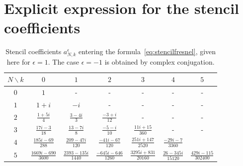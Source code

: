 \documentclass[aps,showpacs,twocolumn,
prd,superscriptaddress,nofootinbib]{revtex4-1}
\begin{document}
\section{Explicit expression for the stencil coefficients}
\label{app:stencil}

\begin{table}[t]
\begin{ruledtabular}\caption{Stencil coefficients $a_{N,k}^{\epsilon}$ entering the formula~\eqref{eq:stencilfresnel}, given here for $\epsilon=1$. The case $\epsilon=-1$ is obtained by complex conjugation.}\label{tab:stencil}
\begin{tabular}{c|cccccc}
	$N \backslash k$ & $0$ & $1$ & $2$ & $3$ & $4$ & $5$ \\
	\hline
	$0$ & $1$ & - & - & - & - & - \\
	$1$ & $1+i$ & $-i$ & - & - & - & - \\
	$2$ & $\frac{1+5i}{4}$ & $\frac{3-4i}{3}$ & $\frac{-3+i}{12}$ & - & - & - \\
	$3$ & $\frac{17 i-3}{18}$ & $\frac{13-7 i}{8}$ & $\frac{-5-i}{10}$ & $\frac{11 i+15}{360}$ & - & - \\
	$4$ & $\frac{185 i-69}{288}$ & $\frac{209-47 i}{120}$ & $\frac{-41 i-67}{120}$ & $\frac{251 i+147}{2520}$ & $\frac{-29 i-7}{3360}$ & \\
	$5$ & $\frac{1669 i-690}{3600}$ & $\frac{2393-135 i}{1440}$ & $\frac{-645 i-646}{1260}$ & $\frac{3295 i+831}{20160}$ & $\frac{26-345 i}{15120}$ & $\frac{429 i-115}{302400}$ \\
\end{tabular}
\end{ruledtabular}
\end{table}
\end{document}
